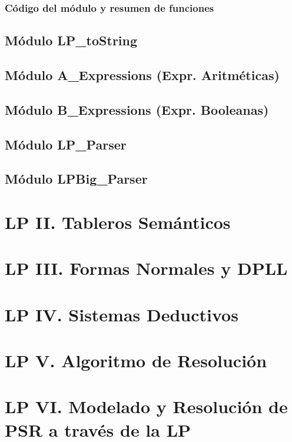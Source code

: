 \documentclass[a4paper]{report}
\begin{document}
\subsection{Código del módulo y resumen de funciones}

\section{Módulo LP\_toString}


\section{Módulo A\_Expressions (Expr. Aritméticas)}
\section{Módulo B\_Expressions (Expr. Booleanas)}
\section{Módulo LP\_Parser}
\section{Módulo LPBig\_Parser}

\chapter{LP II. Tableros Semánticos}
\renewcommand{\mtctitle}{}
\mtcskip
\minitoc
\newpage
\chapter{LP III. Formas Normales y DPLL}
\renewcommand{\mtctitle}{}
\mtcskip
\minitoc
\newpage
\chapter{LP IV. Sistemas Deductivos}
\renewcommand{\mtctitle}{}
\mtcskip
\minitoc
\newpage
\chapter{LP V. Algoritmo de Resolución}
\renewcommand{\mtctitle}{}
\mtcskip
\minitoc
\newpage
\chapter{LP VI. Modelado y Resolución de PSR a través de la LP}
\renewcommand{\mtctitle}{}
\mtcskip
\minitoc
\newpage
\end{document}
